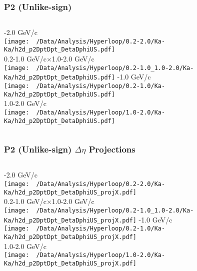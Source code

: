 \documentclass{beamer}
\begin{document}
\begin{frame}
	\frametitle{P2 (Unlike-sign)}
	\begin{columns}
		-2.0 GeV/c\\
		\texttt{[image: ~/Data/Analysis/Hyperloop/0.2-2.0/Ka-Ka/h2d\_p2DptDpt\_DetaDphiUS.pdf]}\\0.2-1.0 GeV/c$\times$1.0-2.0 GeV/c\\
		\texttt{[image: ~/Data/Analysis/Hyperloop/0.2-1.0\_1.0-2.0/Ka-Ka/h2d\_p2DptDpt\_DetaDphiUS.pdf]}
		-1.0 GeV/c\\
		\texttt{[image: ~/Data/Analysis/Hyperloop/0.2-1.0/Ka-Ka/h2d\_p2DptDpt\_DetaDphiUS.pdf]}\\1.0-2.0 GeV/c\\
		\texttt{[image: ~/Data/Analysis/Hyperloop/1.0-2.0/Ka-Ka/h2d\_p2DptDpt\_DetaDphiUS.pdf]}
	\end{columns}
\end{frame}
\begin{frame}
	\frametitle{P2 (Unlike-sign) $\Delta\eta$ Projections}
	\begin{columns}
		\column{0.5\textwidth}
		-2.0 GeV/c\\
		\texttt{[image: ~/Data/Analysis/Hyperloop/0.2-2.0/Ka-Ka/h2d\_p2DptDpt\_DetaDphiUS\_projX.pdf]}\\0.2-1.0 GeV/c$\times$1.0-2.0 GeV/c\\
		\texttt{[image: ~/Data/Analysis/Hyperloop/0.2-1.0\_1.0-2.0/Ka-Ka/h2d\_p2DptDpt\_DetaDphiUS\_projX.pdf]}
		\column{0.5\textwidth}
		-1.0 GeV/c\\
		\texttt{[image: ~/Data/Analysis/Hyperloop/0.2-1.0/Ka-Ka/h2d\_p2DptDpt\_DetaDphiUS\_projX.pdf]}\\1.0-2.0 GeV/c\\
		\texttt{[image: ~/Data/Analysis/Hyperloop/1.0-2.0/Ka-Ka/h2d\_p2DptDpt\_DetaDphiUS\_projX.pdf]}
	\end{columns}
\end{frame}
\end{document}
